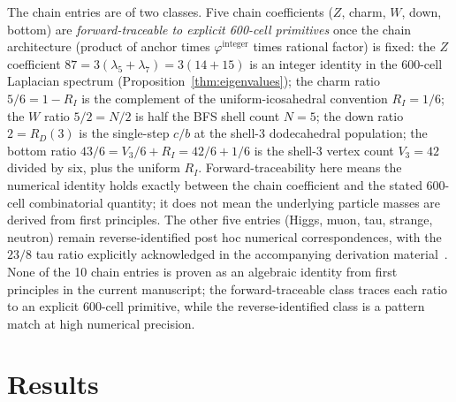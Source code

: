 \documentclass[12pt]{article}
\newcommand{\phig}{\varphi}
\begin{document}
The chain entries are of two classes. Five chain coefficients ($Z$, charm, $W$, down, bottom) are \emph{forward-traceable to explicit 600-cell primitives} once the chain architecture (product of anchor times $\phig^{\text{integer}}$ times rational factor) is fixed: the $Z$ coefficient $87 = 3(\lambda_5 + \lambda_7) = 3(14 + 15)$ is an integer identity in the 600-cell Laplacian spectrum (Proposition~\ref{thm:eigenvalues}); the charm ratio $5/6 = 1 - R_I$ is the complement of the uniform-icosahedral convention $R_I = 1/6$; the $W$ ratio $5/2 = N/2$ is half the BFS shell count $N = 5$; the down ratio $2 = R_D(3)$ is the single-step $c/b$ at the shell-3 dodecahedral population; the bottom ratio $43/6 = V_3/6 + R_I = 42/6 + 1/6$ is the shell-3 vertex count $V_3 = 42$ divided by six, plus the uniform $R_I$. Forward-traceability here means the numerical identity holds exactly between the chain coefficient and the stated 600-cell combinatorial quantity; it does not mean the underlying particle masses are derived from first principles. The other five entries (Higgs, muon, tau, strange, neutron) remain reverse-identified post hoc numerical correspondences, with the $23/8$ tau ratio explicitly acknowledged in the accompanying derivation material~\citep[see][]{PaperV_scripts_h4}. None of the 10 chain entries is proven as an algebraic identity from first principles in the current manuscript; the forward-traceable class traces each ratio to an explicit 600-cell primitive, while the reverse-identified class is a pattern match at high numerical precision.

\section{Results}\label{sec:results}
\end{document}
